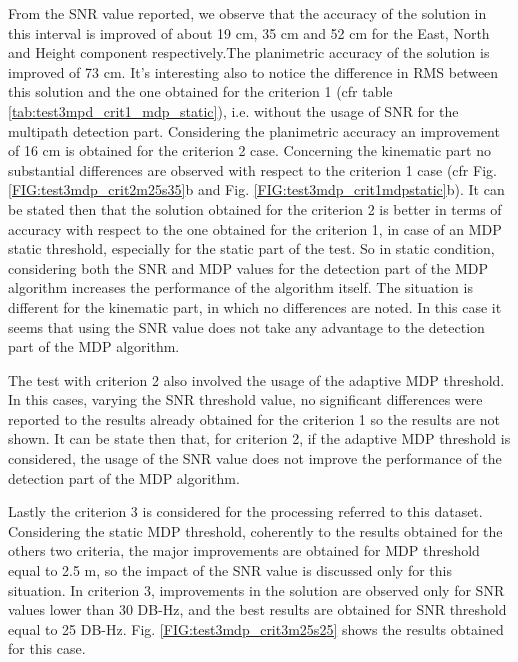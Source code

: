 From the SNR value reported, we observe that the accuracy of the solution in this interval is improved of about 19 cm, 35 cm and 52 cm for the East, North and Height component respectively.The planimetric accuracy of the solution is improved of 73 cm. It's interesting also to notice the difference in RMS between this solution and the one obtained for the criterion 1 (cfr table \ref{tab:test3mpd_crit1_mdp_static}), i.e. without the usage of SNR for the multipath detection part. Considering the planimetric accuracy an improvement of 16 cm is obtained for the criterion 2 case.
Concerning the kinematic part no substantial differences are observed with respect to the criterion 1 case (cfr Fig. \ref{FIG:test3mdp_crit2m25s35}b and Fig. \ref{FIG:test3mdp_crit1mdpstatic}b). 
It can be stated then that the solution obtained for the criterion 2 is better in terms of accuracy with respect to the one obtained for the criterion 1, in case of an MDP static threshold, especially for the static part of the test. So in static condition, considering both the SNR and MDP values for the detection part of the MDP algorithm increases the performance of the algorithm itself. The situation is different for the kinematic part, in which no differences are noted. In this case it seems that using the SNR value does not take any advantage to the detection part of the MDP algorithm.

The test  with criterion 2 also involved  the usage of the adaptive MDP threshold. In this cases, varying the SNR threshold value, no significant differences were reported to the results already obtained for the criterion 1 so the results are not shown. It can be state then that, for criterion 2, if the adaptive MDP threshold is considered, the usage of the SNR value does not improve the performance of the detection part of the MDP algorithm.

Lastly the criterion 3 is considered for the processing referred to this dataset. Considering the static MDP threshold, coherently to the results obtained for the others two criteria, the major improvements are obtained for MDP threshold equal to 2.5 m, so the impact of the SNR value is discussed only for this situation.  In criterion 3, improvements in the solution are observed only for SNR values lower than 30 DB-Hz, and the best results are obtained for SNR threshold equal to 25 DB-Hz. Fig. \ref{FIG:test3mdp_crit3m25s25} shows the results obtained for this case.

